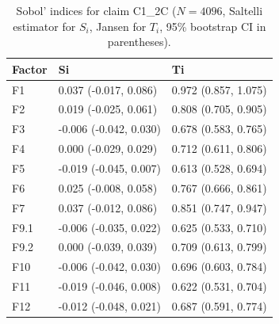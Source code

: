 \begin{table}[ht]
\centering
\caption{Sobol' indices for claim C1_2C ($N=4096$, Saltelli estimator for $S_i$, Jansen for $T_i$, 95\% bootstrap CI in parentheses).} 
\label{tab:sobol_C1_2C}
\begin{tabular}{lll}
  \hline
Factor & Si & Ti \\ 
  \hline
F1 & 0.037 (-0.017, 0.086) & 0.972 (0.857, 1.075) \\ 
  F2 & 0.019 (-0.025, 0.061) & 0.808 (0.705, 0.905) \\ 
  F3 & -0.006 (-0.042, 0.030) & 0.678 (0.583, 0.765) \\ 
  F4 & 0.000 (-0.029, 0.029) & 0.712 (0.611, 0.806) \\ 
  F5 & -0.019 (-0.045, 0.007) & 0.613 (0.528, 0.694) \\ 
  F6 & 0.025 (-0.008, 0.058) & 0.767 (0.666, 0.861) \\ 
  F7 & 0.037 (-0.012, 0.086) & 0.851 (0.747, 0.947) \\ 
  F9.1 & -0.006 (-0.035, 0.022) & 0.625 (0.533, 0.710) \\ 
  F9.2 & 0.000 (-0.039, 0.039) & 0.709 (0.613, 0.799) \\ 
  F10 & -0.006 (-0.042, 0.030) & 0.696 (0.603, 0.784) \\ 
  F11 & -0.019 (-0.046, 0.008) & 0.622 (0.531, 0.704) \\ 
  F12 & -0.012 (-0.048, 0.021) & 0.687 (0.591, 0.774) \\ 
   \hline
\end{tabular}
\end{table}
